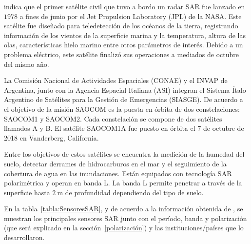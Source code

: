 \citet{Seasat} indica que el primer satélite civil que tuvo a bordo un radar SAR fue lanzado en $1978$ a fines de junio por el Jet Propulsion Laboratory (JPL) de la NASA. Este satélite fue diseñado para teledetección de los océanos de la tierra, registrando información de los vientos de la superficie marina y la temperatura, altura de las olas, características hielo marino entre otros parámetros de interés. Debido a un problema eléctrico, este satélite finalizó sus operaciones a mediados de octubre del mismo año.

La Comisión Nacional de Actividades Espaciales (CONAE) y el INVAP de Argentina, junto con la Agencia Espacial Italiana (ASI) integran el Sistema Ítalo Argentino de Satélites para la Gestión de Emergencias (SIASGE). 
De acuerdo a \citet{Saocom} el objetivo de la misión SAOCOM es la puesta en órbita de dos constelaciones: SAOCOM1 y SAOCOM2. Cada constelación se compone de dos satélites llamados A y B. El satélite SAOCOM1A fue puesto en órbita el 7 de octubre de 2018 en Vanderberg, California. %

Entre los objetivos de estos satélites se encuentra la medición de la humedad del suelo, detectar derrames de hidrocarburos en el mar y el seguimiento de la cobertura de agua en las inundaciones. Están equipados con tecnología SAR polarimétrica y operan en banda L. La banda L permite penetrar a través de la superficie hasta $\SI{2}{\meter}$ de profundidad dependiendo del tipo de suelo. 

En la tabla~\ref{tabla:SensoresSAR}, y de acuerdo a la información obtenida de \citet{Moreira2013}, se muestran los principales sensores SAR junto con el período, banda y polarización (que será explicado en la sección~\ref{polarización}) y las instituciones/países que lo desarrollaron. 


